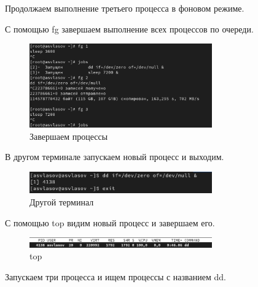 \documentclass[
  12pt,
  a4paper,
  DIV=11,
  numbers=noendperiod]{scrreprt}
\begin{document}
Продолжаем выполнение третьего процесса в фоновом режиме.

С помощью fg завершаем выполнение всех процессов по очереди.

\begin{figure}

{\centering \includegraphics[width=0.7\textwidth,height=\textheight]{image/3.png}

}

\caption{Завершаем процессы}

\end{figure}%

В другом терминале запускаем новый процесс и выходим.

\begin{figure}

{\centering \includegraphics[width=0.7\textwidth,height=\textheight]{image/4.png}

}

\caption{Другой терминал}

\end{figure}%

С помощью top видим новый процесс и завершаем его.

\begin{figure}

{\centering \includegraphics[width=0.7\textwidth,height=\textheight]{image/5.png}

}

\caption{top}

\end{figure}%

Запускаем три процесса и ищем процессы с названием dd.
\end{document}
